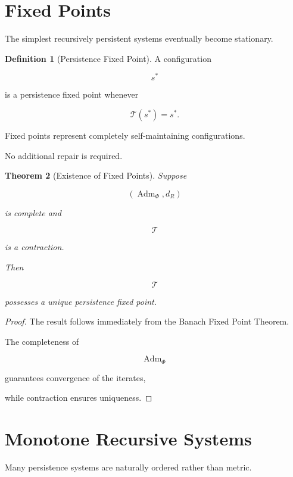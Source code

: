 \documentclass[11pt]{book}
\numberwithin{equation}{chapter}
\theoremstyle{definition}
\newtheorem{definition}{Definition}[chapter]
\theoremstyle{plain}
\newtheorem{theorem}[definition]{Theorem}
\begin{document}
\section{Fixed Points}

The simplest recursively persistent systems eventually become
stationary.

\begin{definition}[Persistence Fixed Point]

A configuration

\[
s^*
\]

is a persistence fixed point whenever

\[
\mathcal T(s^*)
=
s^*.
\]

\end{definition}

Fixed points represent completely self-maintaining configurations.

No additional repair is required.

\begin{theorem}[Existence of Fixed Points]

Suppose

\[
(\operatorname{Adm}_{\Phi},d_R)
\]

is complete and

\[
\mathcal T
\]

is a contraction.

Then

\[
\mathcal T
\]

possesses a unique persistence fixed point.

\end{theorem}

\begin{proof}

The result follows immediately from the Banach Fixed Point Theorem.

The completeness of

\[
\operatorname{Adm}_{\Phi}
\]

guarantees convergence of the iterates,

while contraction ensures uniqueness.

\end{proof}

\section{Monotone Recursive Systems}

Many persistence systems are naturally ordered rather than metric.
\end{document}
